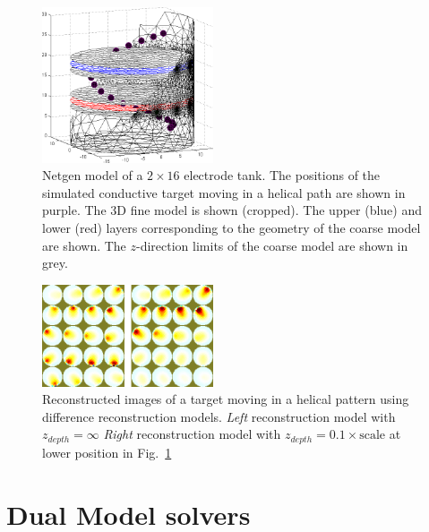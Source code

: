 \documentclass[letterpaper,twocolumn,10pt]{article}
\begin{document}
\begin{figure}[tbh]
\begin{center}
 \includegraphics[width= 0.45\textwidth]{../../tutorial/dual_model/centre_slice02a.png}
\caption{ \label{fig:dual_model}
\small
Netgen model of a $2\times 16$ electrode tank. The positions of the simulated
conductive target moving in a helical path are shown in purple. The
3D fine model is shown (cropped). The upper (blue) and lower (red)
layers corresponding to the geometry of the coarse model are shown. The
$z$-direction limits of the coarse model are shown in grey.
}
\end{center}
\vspace{-1cm}
\end{figure}

\begin{figure}[tbh]
\begin{center}
 \includegraphics[width= 0.45\textwidth]{figs/centre_slice04a_crop.png}
\caption{ \label{fig:dual_model_reconst}
\small
Reconstructed images of a target moving in a helical pattern using
difference reconstruction models.
{\em Left} reconstruction model with  $z_{depth}=\infty$
{\em Right} reconstruction model with $z_{depth}= 0.1\times \mbox{scale}$
at lower position in Fig.~\ref{fig:dual_model}
}
\end{center}
\vspace{-0.5cm}
\end{figure}

\section{Dual Model solvers}
\end{document}
